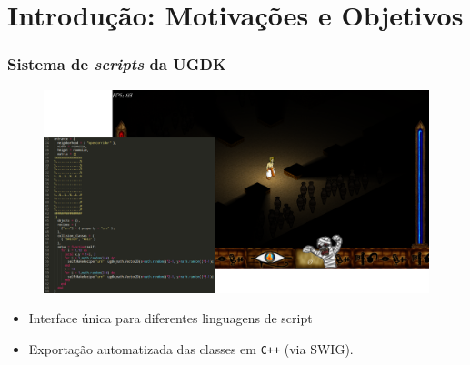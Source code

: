 \documentclass[brazil]{beamer}
\begin{document}
\section{Introdução: Motivações e Objetivos}
\begin{frame}[fragile]
  \frametitle{Sistema de \textit{scripts} da UGDK}
  \pause
  \begin{figure}
    \includegraphics[width=.8\textwidth]{images/horus+sublime.png}
  \end{figure}
  \vspace{-10pt}
  \begin{itemize}
    \pause
    \item Interface única para diferentes linguagens de script
    \pause
    \item Exportação automatizada das classes em \texttt{C++} (via SWIG).
  \end{itemize}
\end{frame}
\end{document}
